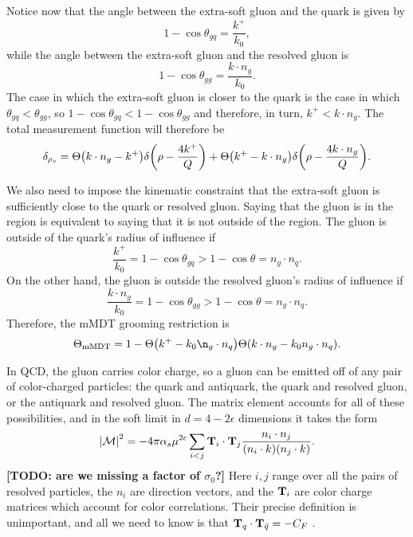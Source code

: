 \documentclass[12pt,twoside,class=../reedthesis, crop=false]{standalone}
\providecommand{\mMDT}{\mathrm{mMDT}}
\providecommand{\cM}{\mathcal{M}}
\begin{document}
	Notice now that the angle between the extra-soft gluon and the quark is given by
	\begin{equation}
		1 - \cos\theta_{gq} = \frac{k^+}{k_0},
	\end{equation}
	while the angle between the extra-soft gluon and the resolved gluon is
	\begin{equation}
		1 - \cos\theta_{gg} = \frac{k \cdot n_g}{k_0}.
	\end{equation}
	The case in which the extra-soft gluon is closer to the quark is the case in which $\theta_{gq} < \theta_{gg}$, so $1 - \cos\theta_{gq} < 1 - \cos\theta_{gg}$ and therefore, in turn, $k^+ < k \cdot n_g$. The total measurement function will therefore be
	\begin{equation}
		\delta_{\rho_s} = \Theta\qty(k \cdot n_g - k^+) \delta\qty(\rho - \frac{4 k^+}{Q}) + \Theta\qty(k^+ - k \cdot n_g) \delta\qty(\rho - \frac{4 k \cdot n_g}{Q}).
	\end{equation}

	We also need to impose the kinematic constraint that the extra-soft gluon is sufficiently close to the quark or resolved gluon. Saying that the gluon is in the region is equivalent to saying that it is not outside of the region. The gluon is outside of the quark's radius of influence if
	\begin{equation}
		\frac{k^+}{k_0} = 1 - \cos\theta_{gq} > 1 - \cos\theta = n_g \cdot n_q.
	\end{equation}
	On the other hand, the gluon is outside the resolved gluon's radius of influence if
	\begin{equation}
		\frac{k \cdot n_g}{k_0} = 1- \cos\theta_{gg} > 1 - \cos\theta = n_g \cdot n_q.
	\end{equation}
	Therefore, the mMDT grooming restriction is
	\begin{equation}
		\Theta_\mMDT = 1 - \Theta\qty(k^+ - k_0 \n_g \cdot n_q) \Theta(k\cdot n_g - k_0 n_g \cdot n_q).
	\end{equation}

	In QCD, the gluon carries color charge, so a gluon can be emitted off of any pair of color-charged particles: the quark and antiquark, the quark and resolved gluon, or the antiquark and resolved gluon. The matrix element accounts for all of these possibilities, and in the soft limit in $d = 4 - 2\epsilon$ dimensions it takes the form \cite{catani_infrared_2000}
	\begin{equation}
		\abs{\cM}^2 = -4\pi\alpha_s \mu^{2\epsilon} \sum_{i < j} \vb{T}_i \cdot \vb{T}_j \frac{n_i \cdot n_j}{(n_i \cdot k) (n_j \cdot k)}.
	\end{equation}
	{\color{red}\textbf{[TODO: are we missing a factor of $\sigma_0$?]}} Here $i, j$ range over all the pairs of resolved particles, the $n_i$ are direction vectors, and the $\vb{T}_i$ are color charge matrices which account for color correlations. Their precise definition is unimportant, and all we need to know is that $\vb{T}_q \cdot \vb{T}_{\bar q} = -C_F$ \cite{catani_infrared_2000}.
\end{document}
